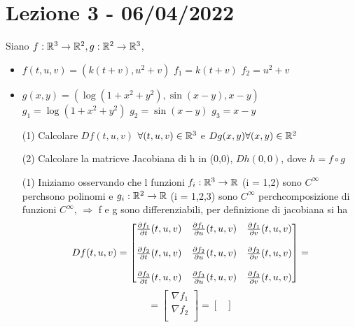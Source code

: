 \section{Lezione 3 - 06/04/2022}
\begin{eexercise}[Es 2, Provetta]
  Siano $f : \R^3 \to \R^2, g : \R^2 \to \R^3$, 
  \begin{itemize}
    \item $f(t,u,v) = \left(k(t+v), u^2+v\right)$
    \subitem $f_1 = k(t+v)$
    \subitem $f_2 = u^2+v$
    \item $g(x,y) = \left(\log(1+x^2+y^2), \sin(x-y), x-y\right)$
    \subitem $g_1 = \log(1+x^2+y^2)$
    \subitem $g_2 = \sin(x-y)$
    \subitem $g_3 = x-y$
  \end{itemize}
  \begin{itemize}
    \item[(1)] Calcolare $D f(t,u,v)$ $\forall (t,u,v)\in \R^3$ e $D g(x,y) \forall (x,y) \in \R^2$
    \item[(2)] Calcolare la matricve Jacobiana di h in (0,0), $D h(0,0)$, dove $h = f\circ g$ 
  \end{itemize}
  \begin{itemize}
    \item[(1)]
              Iniziamo osservando che l funzioni $f_i : \R^3 \to \R$ (i = 1,2) sono $C^{\infty}$ perch\ace sono polinomi e 
              $g_i : \R^2 \to \R$ (i = 1,2,3) sono $C^{\infty}$ perch\ace composizione di funzioni $C^{\infty}$,
              $\Rightarrow$ f e g sono differenziabili, per definizione di jacobiana si ha 
              $$Df(t,u,v) = \begin{bmatrix}
                \frac{\p f_1}{\p t }(t,u,v) & \frac{\p f_1}{\p u }(t,u,v) & \frac{\p f_1}{\p v }(t,u,v) \\
                \\
                \frac{\p f_2}{\p t }(t,u,v) & \frac{\p f_2}{\p u }(t,u,v) & \frac{\p f_2}{\p v }(t,u,v) \\
                \\
                \frac{\p f_3}{\p t }(t,u,v) & \frac{\p f_3}{\p u }(t,u,v) & \frac{\p f_3}{\p v }(t,u,v) \\
              \end{bmatrix} = $$ 
              $$= \begin{bmatrix}
                \nabla f_1 \\ \nabla f_2 \\ 
              \end{bmatrix} = \begin{bmatrix}

\end{bmatrix}$$
\end{itemize}
\end{eexercise}

